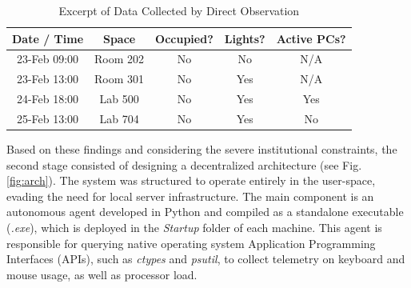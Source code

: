 \documentclass[conference]{IEEEtran}
\begin{document}
\begin{table}[htbp]
    \centering
    \caption{Excerpt of Data Collected by Direct Observation}
    \label{tab:observation}
    \begin{tabular}{|c|c|c|c|c|}
        \hline
        \textbf{Date / Time} & \textbf{Space} & \textbf{Occupied?} & \textbf{Lights?} & \textbf{Active PCs?} \\
        \hline
        23-Feb 09:00 & Room 202 & No & No & N/A \\
        23-Feb 13:00 & Room 301 & No & Yes & N/A \\
        24-Feb 18:00 & Lab 500 & No & Yes & Yes \\
        25-Feb 13:00 & Lab 704 & No & Yes & No \\
        \hline
    \end{tabular}
\end{table}

Based on these findings and considering the severe institutional constraints, the second stage consisted of designing a decentralized architecture (see Fig. \ref{fig:arch}). The system was structured to operate entirely in the user-space, evading the need for local server infrastructure. The main component is an autonomous agent developed in Python and compiled as a standalone executable (\textit{.exe}), which is deployed in the \textit{Startup} folder of each machine. This agent is responsible for querying native operating system Application Programming Interfaces (APIs), such as \textit{ctypes} and \textit{psutil}, to collect telemetry on keyboard and mouse usage, as well as processor load.
\end{document}

